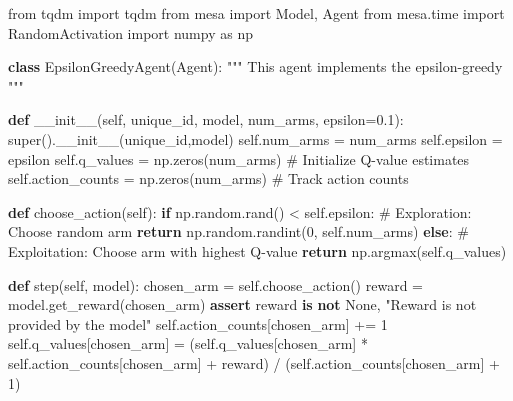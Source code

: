 \documentclass[
  letterpaper,
  DIV=11,
  numbers=noendperiod,
  oneside]{scrartcl}
\newenvironment{Shaded}{\begin{snugshade}}{\end{snugshade}}
\newcommand{\BuiltInTok}[1]{\textcolor[rgb]{0.00,0.23,0.31}{#1}}
\newcommand{\CommentTok}[1]{\textcolor[rgb]{0.37,0.37,0.37}{#1}}
\newcommand{\ControlFlowTok}[1]{\textcolor[rgb]{0.00,0.23,0.31}{\textbf{#1}}}
\newcommand{\DecValTok}[1]{\textcolor[rgb]{0.68,0.00,0.00}{#1}}
\newcommand{\FloatTok}[1]{\textcolor[rgb]{0.68,0.00,0.00}{#1}}
\newcommand{\FunctionTok}[1]{\textcolor[rgb]{0.28,0.35,0.67}{#1}}
\newcommand{\ImportTok}[1]{\textcolor[rgb]{0.00,0.46,0.62}{#1}}
\newcommand{\KeywordTok}[1]{\textcolor[rgb]{0.00,0.23,0.31}{\textbf{#1}}}
\newcommand{\NormalTok}[1]{\textcolor[rgb]{0.00,0.23,0.31}{#1}}
\newcommand{\OperatorTok}[1]{\textcolor[rgb]{0.37,0.37,0.37}{#1}}
\newcommand{\StringTok}[1]{\textcolor[rgb]{0.13,0.47,0.30}{#1}}
\newcommand{\VariableTok}[1]{\textcolor[rgb]{0.07,0.07,0.07}{#1}}
\theoremstyle{definition}
\theoremstyle{remark}
\begin{document}
\begin{Shaded}
\begin{Highlighting}[]
\ImportTok{from}\NormalTok{ tqdm }\ImportTok{import}\NormalTok{ tqdm}
\ImportTok{from}\NormalTok{ mesa }\ImportTok{import}\NormalTok{ Model, Agent}
\ImportTok{from}\NormalTok{ mesa.time }\ImportTok{import}\NormalTok{ RandomActivation}
\ImportTok{import}\NormalTok{ numpy }\ImportTok{as}\NormalTok{ np}



\KeywordTok{class}\NormalTok{ EpsilonGreedyAgent(Agent):}
    \CommentTok{"""}
\CommentTok{    This agent implements the epsilon{-}greedy }
\CommentTok{    """}

    \KeywordTok{def} \FunctionTok{\_\_init\_\_}\NormalTok{(}\VariableTok{self}\NormalTok{, unique\_id, model, num\_arms, epsilon}\OperatorTok{=}\FloatTok{0.1}\NormalTok{):}
        \BuiltInTok{super}\NormalTok{().}\FunctionTok{\_\_init\_\_}\NormalTok{(unique\_id,model)}
        \VariableTok{self}\NormalTok{.num\_arms }\OperatorTok{=}\NormalTok{ num\_arms}
        \VariableTok{self}\NormalTok{.epsilon }\OperatorTok{=}\NormalTok{ epsilon}
        \VariableTok{self}\NormalTok{.q\_values }\OperatorTok{=}\NormalTok{ np.zeros(num\_arms)  }\CommentTok{\# Initialize Q{-}value estimates}
        \VariableTok{self}\NormalTok{.action\_counts }\OperatorTok{=}\NormalTok{ np.zeros(num\_arms)  }\CommentTok{\# Track action counts}

    \KeywordTok{def}\NormalTok{ choose\_action(}\VariableTok{self}\NormalTok{):}
        \ControlFlowTok{if}\NormalTok{ np.random.rand() }\OperatorTok{\textless{}} \VariableTok{self}\NormalTok{.epsilon:}
            \CommentTok{\# Exploration: Choose random arm}
            \ControlFlowTok{return}\NormalTok{ np.random.randint(}\DecValTok{0}\NormalTok{, }\VariableTok{self}\NormalTok{.num\_arms)}
        \ControlFlowTok{else}\NormalTok{:}
            \CommentTok{\# Exploitation: Choose arm with highest Q{-}value}
            \ControlFlowTok{return}\NormalTok{ np.argmax(}\VariableTok{self}\NormalTok{.q\_values)}

    \KeywordTok{def}\NormalTok{ step(}\VariableTok{self}\NormalTok{, model):}
\NormalTok{        chosen\_arm }\OperatorTok{=} \VariableTok{self}\NormalTok{.choose\_action()}
\NormalTok{        reward }\OperatorTok{=}\NormalTok{ model.get\_reward(chosen\_arm)}
        \ControlFlowTok{assert}\NormalTok{ reward }\KeywordTok{is} \KeywordTok{not} \VariableTok{None}\NormalTok{, }\StringTok{"Reward is not provided by the model"}
        \VariableTok{self}\NormalTok{.action\_counts[chosen\_arm] }\OperatorTok{+=} \DecValTok{1}
        \VariableTok{self}\NormalTok{.q\_values[chosen\_arm] }\OperatorTok{=}\NormalTok{ (}\VariableTok{self}\NormalTok{.q\_values[chosen\_arm] }\OperatorTok{*} \VariableTok{self}\NormalTok{.action\_counts[chosen\_arm] }\OperatorTok{+}\NormalTok{ reward) }\OperatorTok{/}\NormalTok{ (}\VariableTok{self}\NormalTok{.action\_counts[chosen\_arm] }\OperatorTok{+} \DecValTok{1}\NormalTok{)}



\end{Highlighting}
\end{Shaded}
\end{document}
